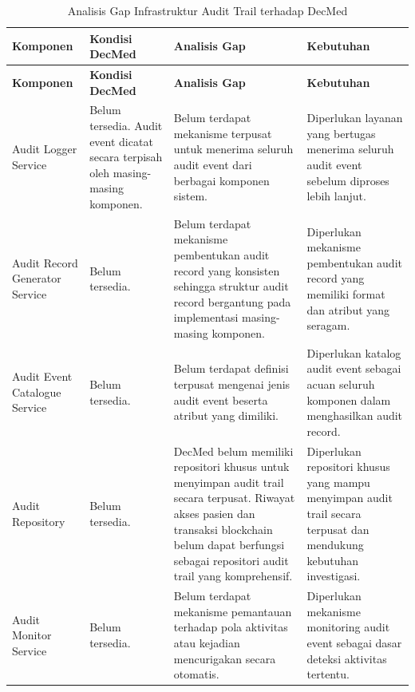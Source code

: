 \begin{xltabular}{\textwidth}{|p{3.2cm}|p{3.2cm}|X|X|}
\caption{Analisis Gap Infrastruktur Audit Trail terhadap DecMed}
\label{tab:gap_komponen_audit}\\

\hline
\textbf{Komponen} &
\textbf{Kondisi DecMed} &
\textbf{Analisis Gap} &
\textbf{Kebutuhan}\\
\hline
\endfirsthead

\hline
\textbf{Komponen} &
\textbf{Kondisi DecMed} &
\textbf{Analisis Gap} &
\textbf{Kebutuhan}\\
\hline
\endhead

\hline
\endfoot

Audit Logger Service &
Belum tersedia. Audit event dicatat secara terpisah oleh masing-masing komponen. &
Belum terdapat mekanisme terpusat untuk menerima seluruh audit event dari berbagai komponen sistem. &
Diperlukan layanan yang bertugas menerima seluruh audit event sebelum diproses lebih lanjut.\\
\hline

Audit Record Generator Service &
Belum tersedia. &
Belum terdapat mekanisme pembentukan audit record yang konsisten sehingga struktur audit record bergantung pada implementasi masing-masing komponen. &
Diperlukan mekanisme pembentukan audit record yang memiliki format dan atribut yang seragam.\\
\hline

Audit Event Catalogue Service &
Belum tersedia. &
Belum terdapat definisi terpusat mengenai jenis audit event beserta atribut yang dimiliki. &
Diperlukan katalog audit event sebagai acuan seluruh komponen dalam menghasilkan audit record.\\
\hline

Audit Repository &
Belum tersedia. &
DecMed belum memiliki repositori khusus untuk menyimpan audit trail secara terpusat. Riwayat akses pasien dan transaksi blockchain belum dapat berfungsi sebagai repositori audit trail yang komprehensif. &
Diperlukan repositori khusus yang mampu menyimpan audit trail secara terpusat dan mendukung kebutuhan investigasi.\\
\hline

Audit Monitor Service &
Belum tersedia. &
Belum terdapat mekanisme pemantauan terhadap pola aktivitas atau kejadian mencurigakan secara otomatis. &
Diperlukan mekanisme monitoring audit event sebagai dasar deteksi aktivitas tertentu.\\
\hline


\end{xltabular}

